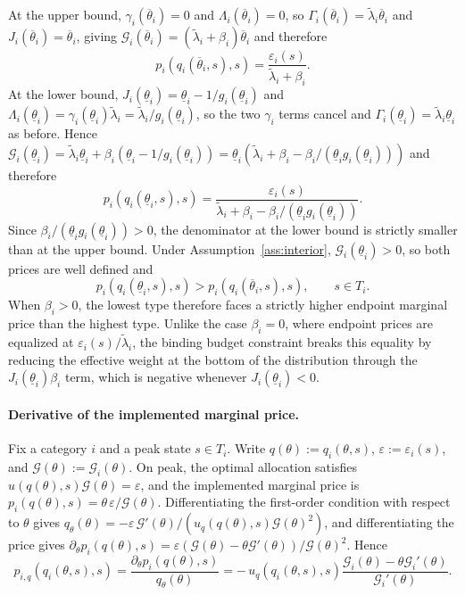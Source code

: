 \documentclass{class}
\begin{document}
At the upper bound, $\gamma_i(\overline{\theta}_i) = 0$ and $\Lambda_i(\overline{\theta}_i) = 0$, so $\Gamma_i(\overline{\theta}_i) = \tilde{\lambda}_i\overline{\theta}_i$ and $J_i(\overline{\theta}_i) = \overline{\theta}_i$, giving $\mathcal{G}_i(\overline{\theta}_i) = (\tilde{\lambda}_i + \beta_i)\overline{\theta}_i$ and therefore
\[
p_i\!\left(q_i(\overline{\theta}_i,s),s\right) = \frac{\varepsilon_i(s)}{\tilde{\lambda}_i + \beta_i}.
\]
At the lower bound, $J_i(\underline{\theta}_i) = \underline{\theta}_i - 1/g_i(\underline{\theta}_i)$ and $\Lambda_i(\underline{\theta}_i) = \gamma_i(\underline{\theta}_i)\tilde{\lambda}_i = \tilde{\lambda}_i/g_i(\underline{\theta}_i)$, so the two $\gamma_i$ terms cancel and $\Gamma_i(\underline{\theta}_i) = \tilde{\lambda}_i\underline{\theta}_i$ as before. Hence $\mathcal{G}_i(\underline{\theta}_i) = \tilde{\lambda}_i\underline{\theta}_i + \beta_i(\underline{\theta}_i - 1/g_i(\underline{\theta}_i)) = \underline{\theta}_i(\tilde{\lambda}_i + \beta_i - \beta_i/(\underline{\theta}_i g_i(\underline{\theta}_i)))$ and therefore
\[
p_i\!\left(q_i(\underline{\theta}_i,s),s\right) = \frac{\varepsilon_i(s)}{\tilde{\lambda}_i + \beta_i - \beta_i/(\underline{\theta}_i g_i(\underline{\theta}_i))}.
\]
Since $\beta_i/(\underline{\theta}_i g_i(\underline{\theta}_i)) > 0$, the denominator at the lower bound is strictly smaller than at the upper bound. Under Assumption~\ref{ass:interior}, $\mathcal{G}_i(\underline{\theta}_i) > 0$, so both prices are well defined and
\[
p_i\!\left(q_i(\underline{\theta}_i,s),s\right) > p_i\!\left(q_i(\overline{\theta}_i,s),s\right), \qquad s \in T_i.
\]
When $\beta_i > 0$, the lowest type therefore faces a strictly higher endpoint marginal price than the highest type. Unlike the case $\beta_i = 0$, where endpoint prices are equalized at $\varepsilon_i(s)/\tilde{\lambda}_i$, the binding budget constraint breaks this equality by reducing the effective weight at the bottom of the distribution through the $J_i(\underline{\theta}_i)\beta_i$ term, which is negative whenever $J_i(\underline{\theta}_i) < 0$.

\paragraph{Derivative of the implemented marginal price.}
Fix a category $i$ and a peak state $s \in T_i$. Write $q(\theta) := q_i(\theta,s)$, $\varepsilon := \varepsilon_i(s)$, and $\mathcal{G}(\theta) := \mathcal{G}_i(\theta)$. On peak, the optimal allocation satisfies $u(q(\theta),s)\mathcal{G}(\theta) = \varepsilon$, and the implemented marginal price is $p_i(q(\theta),s) = \theta\,\varepsilon/\mathcal{G}(\theta)$. Differentiating the first-order condition with respect to $\theta$ gives $q_\theta(\theta) = -\varepsilon\,\mathcal{G}'(\theta)/(u_q(q(\theta),s)\mathcal{G}(\theta)^2)$, and differentiating the price gives $\partial_\theta p_i(q(\theta),s) = \varepsilon(\mathcal{G}(\theta) - \theta\mathcal{G}'(\theta))/\mathcal{G}(\theta)^2$. Hence
\[
p_{i,q}\!\left(q_i(\theta,s),s\right) = \frac{\partial_\theta p_i(q(\theta),s)}{q_\theta(\theta)} = -\,u_q\!\left(q_i(\theta,s),s\right)\frac{\mathcal{G}_i(\theta) - \theta\mathcal{G}_i'(\theta)}{\mathcal{G}_i'(\theta)}.
\]
\end{document}
